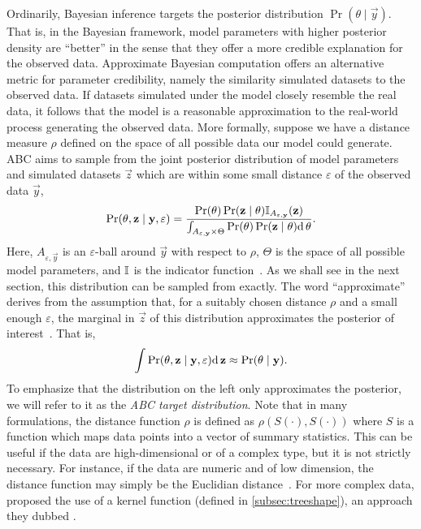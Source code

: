 Ordinarily, Bayesian inference targets the posterior distribution $\Pr(\theta
\mid \vec{y})$. That is, in the Bayesian framework, model parameters with
higher posterior density are ``better'' in the sense that they offer a more
credible explanation for the observed data. Approximate Bayesian computation
offers an alternative metric for parameter credibility, namely the similarity
simulated datasets to the observed data. If datasets simulated under the model
closely resemble the real data, it follows that the model is a reasonable
approximation to the real-world process generating the observed data. More
formally, suppose we have a distance measure $\rho$ defined on the space of all
possible data our model could generate. \gls{ABC} aims to sample from the joint
posterior distribution of model parameters and simulated datasets $\vec{z}$
which are within some small distance $\varepsilon$ of the observed data
$\vec{y}$,
\[
  \Pr(\theta, \mathbf{z} \mid \mathbf{y}, \varepsilon) =
  \frac{\Pr(\theta) \Pr(\mathbf{z} \mid \theta) \mathbb{I}_{A_{\varepsilon, \mathbf{y}}} (\mathbf{z})}
  {\int_{A_{\varepsilon, \mathbf{y}} \times \Theta} \Pr(\theta) \Pr(\mathbf{z} \mid \theta) \mathrm{d}\, \theta}.
\]
Here, $A_{\varepsilon, \vec{y}}$ is an $\varepsilon$-ball around $\vec{y}$ with
respect to $\rho$, $\Theta$ is the space of all possible model parameters, and
$\mathbb{I}$ is the indicator function~\autocite{marin2012approximate}. As we shall
see in the next section, this distribution can be sampled from exactly. The
word ``approximate'' derives from the assumption that, for a suitably chosen
distance $\rho$ and a small enough $\varepsilon$, the marginal in $\vec{z}$ of
this distribution approximates the posterior of
interest~\autocite{marin2012approximate}. That is,
\[
  \int \Pr(\theta, \mathbf{z} \mid \mathbf{y}, \varepsilon) \mathrm{d}\,\mathbf{z}
  \approx \Pr(\theta \mid \mathbf{y}).
\]
To emphasize that the distribution on the left only approximates the posterior,
we will refer to it as the \textit{\gls{ABC} target distribution}. Note that in
many formulations, the distance function $\rho$ is defined as $\rho(S(\cdot),
S(\cdot))$ where $S$ is a function which maps data points into a vector of
summary statistics. This can be useful if the data are high-dimensional or of a
complex type, but it is not strictly necessary. For instance, if the data are
numeric and of low dimension, the distance function may simply be the Euclidian
distance~\autocite{sisson2007sequential}. For more complex data,
\textcite{nakagome2013kernel} proposed the use of a kernel function (defined in
\cref{subsec:treeshape}), an approach they dubbed .

